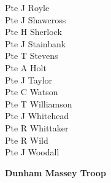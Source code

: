 \begin{multicols}{2}
  Pte J Royle \\
  Pte J Shawcross \\
  Pte H Sherlock \\
  Pte J Stainbank \\
  Pte T Stevens \\
  Pte A Holt \\
  Pte J Taylor \\
  Pte C Watson \\
  Pte T Williamson \\
  Pte J Whitehead \\
  Pte R Whittaker \\
  Pte R Wild \\
  Pte J Woodall \\
\end{multicols}

\begin{center}
  \Large
  \textbf{Dunham Massey Troop}
\end{center}

